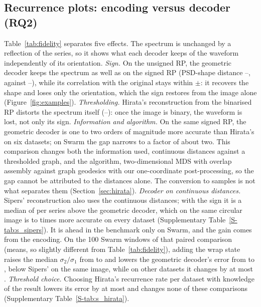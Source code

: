 \documentclass[preprint,review,12pt]{elsarticle}
\begin{document}
\subsection{Recurrence plots: encoding versus decoder (RQ2)}\label{sec:results_rp}
Table~\ref{tab:fidelity} separates five effects. The spectrum is unchanged by a reflection of the series, so it shows what each decoder keeps of the waveform independently of its orientation. \emph{Sign.} On the unsigned RP, the geometric decoder keeps the spectrum as well as on the signed RP (PSD-shape distance \psdGeoUnsMin--\psdGeoUnsMax{}, against \psdGeoSigMin--\psdGeoSigMax{}), while its correlation with the original stays within $\pm$\pearsonUnsAbsMax{}: it recovers the shape and loses only the orientation, which the sign restores from the image alone (Figure~\ref{fig:examples}). \emph{Thresholding.} Hirata's reconstruction from the binarised RP distorts the spectrum itself (\psdHirMin--\psdHirMax{}): once the image is binary, the waveform is lost, not only its sign. \emph{Information and algorithm.} On the same signed RP, the geometric decoder is one to two orders of magnitude more accurate than Hirata's on six datasets; on Swarm the gap narrows to a factor of about two. This comparison changes both the information used, continuous distances against a thresholded graph, and the algorithm, two-dimensional MDS with overlap assembly against graph geodesics with our one-coordinate post-processing, so the gap cannot be attributed to the distances alone. The conversion to samples is not what separates them (Section~\ref{sec:hirata}). \emph{Decoder on continuous distances.} Sipers' reconstruction also uses the continuous distances; with the sign it is a median of \macroDiffRPSIPERSSIGNED{} per series above the geometric decoder, which on the same circular image is \pilotRatioMin{} to \pilotRatioMax{} times more accurate on every dataset (Supplementary Table~\ref{S-tab:s_sipers}). It is ahead in the benchmark only on Swarm, and the gain comes from the encoding. On the 100 Swarm windows of that paired comparison (means, so slightly different from Table~\ref{tab:fidelity}), adding the wrap state raises the median $\sigma_2/\sigma_1$ from \swRatioNonCirc{} to \swRatioCirc{} and lowers the geometric decoder's error from \swGeoNonCirc{} to \swGeoCirc{}, below Sipers' \swSipCirc{} on the same image, while on other datasets it changes by at most \encGapMax{}. \emph{Threshold choice.} Choosing Hirata's recurrence rate per dataset with knowledge of the result lowers its error by at most \hirataGainUns{} and changes none of these comparisons (Supplementary Table~\ref{S-tab:s_hirata}).
\end{document}
